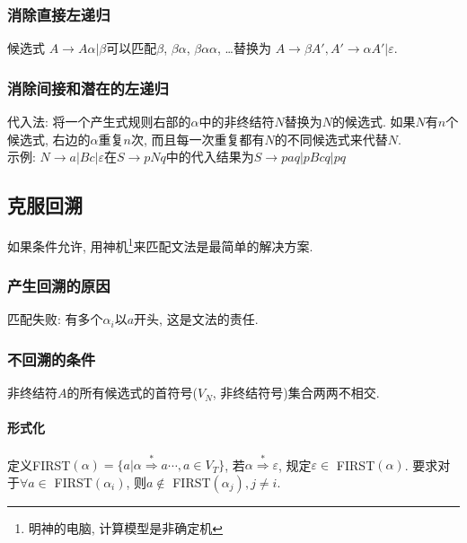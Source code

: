             \subsubsection{消除直接左递归}

                候选式 $A\to A\alpha|\beta$可以匹配$\beta$, $\beta\alpha$, $\beta\alpha\alpha$, \ldots 替换为 $A\to\beta A', A'\to\alpha A'|\varepsilon$.

            \subsubsection{消除间接和潜在的左递归}

                \textsf{代入法}: 将一个产生式规则右部的$\alpha$中的非终结符$N$替换为$N$的候选式. 如果$N$有$n$个候选式, 右边的$\alpha$重复$n$次, 而且每一次重复都有$N$的不同候选式来代替$N$. \\
                示例: $N\to a|Bc|\varepsilon$在$S\to pNq$中的代入结果为$S\to paq|pBcq|pq$

        \subsection{克服回溯}

            如果条件允许, 用神机\footnote{明神的电脑, 计算模型是非确定机}来匹配文法是最简单的解决方案.

            \subsubsection{产生回溯的原因}

                匹配失败: 有多个$\alpha_i$以$a$开头, 这是文法的责任.

            \subsubsection{不回溯的条件}

                非终结符$A$的所有候选式的首符号($V_N$, 非终结符号)集合两两不相交.

                \paragraph{形式化} 定义FIRST$(\alpha)=\{a|\alpha\stackrel{*}{\Rightarrow}a\cdots, a\in V_T\}$, 若$\alpha\stackrel{*}{\Rightarrow}\varepsilon$, 规定$\varepsilon\in$ FIRST$(\alpha)$. 要求对于$\forall a\in$ FIRST$(\alpha_i)$, 则$a\not\in$ FIRST$(\alpha_j), j\neq i$.

